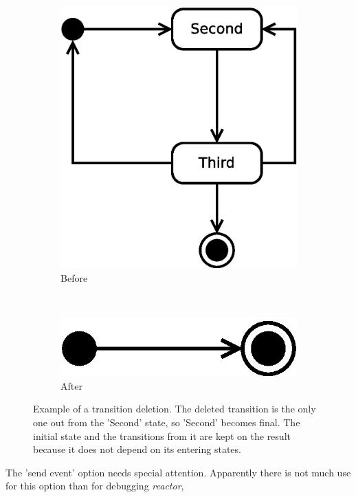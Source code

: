 \begin{figure}[h]
 \centering
 \begin{subfigure}[b]{0.3\textwidth}
  \centering
  \includegraphics[width=\textwidth,keepaspectratio]{img/exsm2-1}
  \caption{Before}
 \end{subfigure}
 ~
 \begin{subfigure}[b]{0.3\textwidth}
  \centering
  \includegraphics[width=\textwidth,keepaspectratio]{img/exsm2-2}
  \caption{After}
 \end{subfigure}
 \caption{Example of a transition deletion. The deleted transition is the only one out from the 'Second' state, so 'Second' becomes final.
 The initial state and the transitions from it are kept on the result because it does not depend on its entering states.}
 \label{fig:exsm2}
\end{figure}
The 'send event' option needs special attention. Apparently there is not much use for this option than for debugging \emph{reactor},
